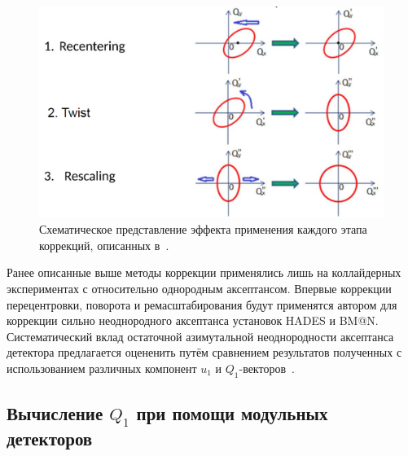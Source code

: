 \begin{figure}[h]
    \centering
    \includegraphics[width=0.5\linewidth]{images/corrections_for_nonuniformity.png}
    \caption{Схематическое представление эффекта применения каждого этапа коррекций, описанных в~\cite{Selyuzhenkov:2007zi}.}
    \label{fig:qn_corrections}
\end{figure}
Ранее описанные выше методы коррекции применялись лишь на коллайдерных экспериментах с относительно однородным аксептансом. 
Впервые коррекции перецентровки, поворота и ремасштабирования будут применятся автором для коррекции сильно неоднородного аксептанса установок HADES и BM@N.
Систематический вклад остаточной азимутальной неоднородности аксептанса детектора предлагается оцененить путём сравнением результатов полученных с использованием различных компонент $u_1$ и $Q_1$-векторов~\cite{Mamaev:2020qom,Mamaev:2023yhz}. 

\subsection{Вычисление $Q_1$ при помощи модульных детекторов}

